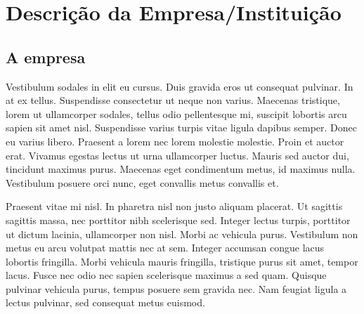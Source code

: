 \chapter[Descrição da Empresa/Instituição]{Descrição da Empresa/Instituição}


\section{A empresa}

Vestibulum sodales in elit eu cursus. Duis gravida eros ut consequat pulvinar. In at ex tellus. Suspendisse consectetur ut neque non varius. Maecenas tristique, lorem ut ullamcorper sodales, tellus odio pellentesque mi, suscipit lobortis arcu sapien sit amet nisl. Suspendisse varius turpis vitae ligula dapibus semper. Donec eu varius libero. Praesent a lorem nec lorem molestie molestie. Proin et auctor erat. Vivamus egestas lectus ut urna ullamcorper luctus. Mauris sed auctor dui, tincidunt maximus purus. Maecenas eget condimentum metus, id maximus nulla. Vestibulum posuere orci nunc, eget convallis metus convallis et.

Praesent vitae mi nisl. In pharetra nisl non justo aliquam placerat. Ut sagittis sagittis massa, nec porttitor nibh scelerisque sed. Integer lectus turpis, porttitor ut dictum lacinia, ullamcorper non nisl. Morbi ac vehicula purus. Vestibulum non metus eu arcu volutpat mattis nec at sem. Integer accumsan congue lacus lobortis fringilla. Morbi vehicula mauris fringilla, tristique purus sit amet, tempor lacus. Fusce nec odio nec sapien scelerisque maximus a sed quam. Quisque pulvinar vehicula purus, tempus posuere sem gravida nec. Nam feugiat ligula a lectus pulvinar, sed consequat metus euismod.
